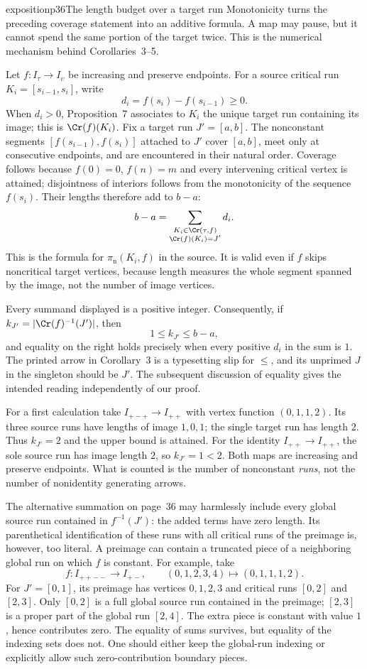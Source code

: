 \begin{dcomment}{exposition}{p36}{The length budget over a target run}
Monotonicity turns the preceding coverage statement into an additive formula. A map may pause, but it cannot spend the same portion of the target twice. This is the numerical mechanism behind Corollaries~3--5.

Let $f:I_\tau\to I_\upsilon$ be increasing and preserve endpoints. For a source critical run $K_i=[s_{i-1},s_i]$, write
\[
 d_i=f(s_i)-f(s_{i-1})\geq0.
\]
When $d_i>0$, Proposition~7 associates to $K_i$ the unique target run containing its image; this is $\Cr(f)(K_i)$. Fix a target run $J'=[a,b]$. The nonconstant segments $[f(s_{i-1}),f(s_i)]$ attached to $J'$ cover $[a,b]$, meet only at consecutive endpoints, and are encountered in their natural order. Coverage follows because $f(0)=0$, $f(n)=m$ and every intervening critical vertex is attained; disjointness of interiors follows from the monotonicity of the sequence $f(s_i)$. Their lengths therefore add to $b-a$:
\[
 b-a=\sum_{\substack{K_i\in\Cr(\tau,f)\\\Cr(f)(K_i)=J'}}d_i.
\]
This is the formula for $\pi_{\mathrm n}(K_i,f)$ in the source. It is valid even if $f$ skips noncritical target vertices, because length measures the whole segment spanned by the image, not the number of image vertices.

Every summand displayed is a positive integer. Consequently, if $k_{J'}=|\Cr(f)^{-1}(J')|$, then
\[
 1\leq k_{J'}\leq b-a,
\]
and equality on the right holds precisely when every positive $d_i$ in the sum is $1$. The printed arrow in Corollary~3 is a typesetting slip for $\leq$, and its unprimed $J$ in the singleton should be $J'$. The subsequent discussion of equality gives the intended reading independently of our proof.

For a first calculation take $I_{+-+}\to I_{++}$ with vertex function $(0,1,1,2)$. Its three source runs have lengths of image $1,0,1$; the single target run has length $2$. Thus $k_{J'}=2$ and the upper bound is attained. For the identity $I_{++}\to I_{++}$, the sole source run has image length $2$, so $k_{J'}=1<2$. Both maps are increasing and preserve endpoints. What is counted is the number of nonconstant \emph{runs}, not the number of nonidentity generating arrows.

The alternative summation on page~36 may harmlessly include every global source run contained in $f^{-1}(J')$: the added terms have zero length. Its parenthetical identification of these runs with all critical runs of the preimage is, however, too literal. A preimage can contain a truncated piece of a neighboring global run on which $f$ is constant. For example, take
\[
 f:I_{++--}\longrightarrow I_{+-},\qquad
 (0,1,2,3,4)\longmapsto(0,1,1,1,2).
\]
For $J'=[0,1]$, its preimage has vertices $0,1,2,3$ and critical runs $[0,2]$ and $[2,3]$. Only $[0,2]$ is a full global source run contained in the preimage; $[2,3]$ is a proper part of the global run $[2,4]$. The extra piece is constant with value $1$, hence contributes zero. The equality of sums survives, but equality of the indexing sets does not. One should either keep the global-run indexing or explicitly allow such zero-contribution boundary pieces.
\end{dcomment}

